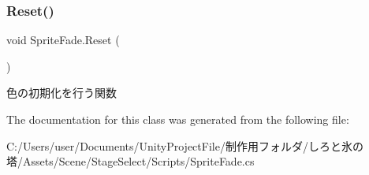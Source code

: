 \subsubsection{\texorpdfstring{Reset()}{Reset()}}
{\footnotesize\ttfamily void Sprite\+Fade.\+Reset (\begin{DoxyParamCaption}{ }\end{DoxyParamCaption})\hspace{0.3cm}{\ttfamily [inline]}}



色の初期化を行う関数 



The documentation for this class was generated from the following file\+:\begin{DoxyCompactItemize}
\item 
C\+:/\+Users/user/\+Documents/\+Unity\+Project\+File/制作用フォルダ/しろと氷の塔/\+Assets/\+Scene/\+Stage\+Select/\+Scripts/Sprite\+Fade.\+cs\end{DoxyCompactItemize}
